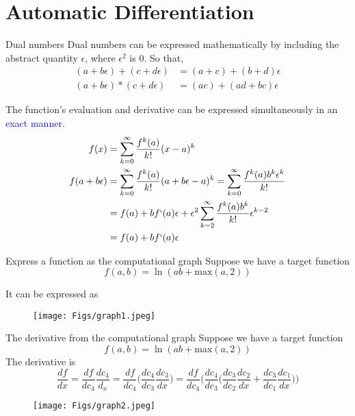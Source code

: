 \documentclass{beamer}
\begin{document}
\section{Automatic Differentiation}
\begin{frame}{Dual numbers}
Dual numbers can be expressed mathematically by including the abstract quantity $\epsilon$, where $\epsilon^2$ is 0. So that,
\begin{equation*}
\begin{split}
    (a+b\epsilon)+(c+d\epsilon) &= (a+c) + (b+d)\epsilon\\
    (a+b\epsilon)*(c+d\epsilon) &= (ac) + (ad+bc)\epsilon
\end{split}
\end{equation*}

The function's evaluation and derivative can be expressed simultaneously in an \textcolor{blue}{exact manner}.
\begin{equation*}
\begin{split}
    f(x) &= \sum_{k=0}^\infty \frac{f^k(a)}{k!}(x-a)^k \\
    f(a+b\epsilon) &= \sum_{k=0}^\infty \frac{f^k(a)}{k!}(a+b\epsilon-a)^k
    = \sum_{k=0}^\infty \frac{f^k(a)b^k\epsilon^k}{k!}\\
    &= f(a) + bf`(a)\epsilon + \epsilon^2 \sum_{k=2}^\infty \frac{f^k(a)b^k}{k!}\epsilon^{k-2}\\
    &= f(a) + bf`(a)\epsilon
\end{split}
\end{equation*}

\end{frame}

\begin{frame}{Express a function as the computational graph}
Suppose we have a target function
\begin{equation*}
f(a, b) = \ln(ab + \textrm{max}(a, 2))
\end{equation*}

It can be expressed as
\begin{figure}
\centering
\texttt{[image: Figs/graph1.jpeg]}
\end{figure}

\end{frame}

\begin{frame}{The derivative from the computational graph}
Suppose we have a target function
\begin{equation*}
f(a, b) = \ln(ab + \textrm{max}(a, 2))
\end{equation*}
The derivative is 
\begin{equation*}
\frac{df}{dx} = \frac{df}{dc_4}\frac{dc_4}{d_x} 
= \frac{df}{dc_4}\bigg(\frac{dc_4}{dc_3}\frac{dc_3}{dx}\bigg)
= \frac{df}{dc_4}\bigg(\frac{dc_4}{dc_3}\bigg(\frac{dc_3}{dc_2}\frac{dc_2}{dx} + \frac{dc_3}{dc_1}\frac{dc_1}{dx}\bigg)\bigg)
\end{equation*}

\begin{figure}
\centering
\texttt{[image: Figs/graph2.jpeg]}
\end{figure}

\end{frame}
\end{document}
